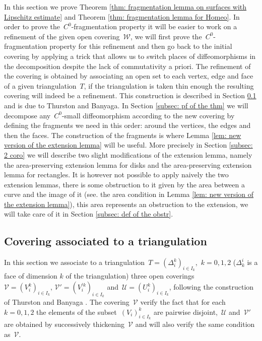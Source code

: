 \documentclass[10pt]{amsart}
\begin{document}
In this section we prove Theorem \ref{thm: fragmentation lemma on surfaces with Lipschitz estimate} and Theorem \ref{thm: fragmentation lemma for Homeo}. In order to prove the~$C^0$-fragmentation property it will be easier to work on a refinement of the given open covering~$\mathcal{W}$, we will first prove the~$C^0$-fragmentation property for this refinement and then go back to the initial covering by applying a trick that allows us to switch places of diffeomorphisms in the decomposition despite the lack of commutativity a priori. The refinement of the covering is obtained by associating an open set to each vertex, edge and face of a given triangulation~$T$, if the triangulation is taken thin enough the resulting covering will indeed be a refinement. This construction is described in Section \ref{subsec: def of covering} and is due to Thurston and Banyaga. In Section \ref{subsec: pf of the thm} we will decompose any~$C^0$-small diffeomorphism according to the new covering by defining the fragments we need in this order: around the vertices, the edges and then the faces. The construction of the fragments is where Lemma \ref{lem: new version of the extension lemma} will be useful. More precisely in Section \ref{subsec: 2 coro} we will describe two slight modifications of the extension lemma, namely the area-preserving extension lemma for disks and the area-preserving extension lemma for rectangles. It is however not possible to apply naively the two extension lemmas, there is some obstruction to it given by the area between a curve and the image of it (see. the area condition in Lemma \ref{lem: new version of the extension lemma}), this area represents an obstruction to the extension, we will take care of it in Section \ref{subsec: def of the obstr}.


\subsection{Covering associated to a triangulation}\label{subsec: def of covering}

In this section we associate to a triangulation~$T=(\Delta_i^k)_{i\in I_k}$,~$k=0,1,2$ ($\Delta_k^i$ is a face of dimension $k$ of the triangulation) three open coverings~$\mathcal{V}=(V_i^k)_{i\in I_k},\,\mathcal{V}'=(V_i^{'k})_{i\in I_k}$ and~$\mathcal{U}=(U_i^k)_{i\in I_k}$, following the construction of Thurston and Banyaga \cite{Ban78}. The covering~$\mathcal{V}$ verify the fact that for each~$k=0,1,2$ the elements of the subset~$(V_i)_{i\in I_k}^k$ are pairwise disjoint,~$\mathcal{U}$ and~$\mathcal{V'}$ are obtained by successively thickening~$\mathcal{V}$ and will also verify the same condition as~$\mathcal{V}$.
\end{document}
